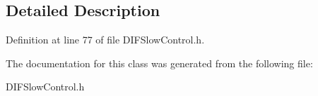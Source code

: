 \subsection{Detailed Description}


Definition at line 77 of file D\-I\-F\-Slow\-Control.\-h.



The documentation for this class was generated from the following file\-:\begin{DoxyCompactItemize}
\item 
D\-I\-F\-Slow\-Control.\-h\end{DoxyCompactItemize}
